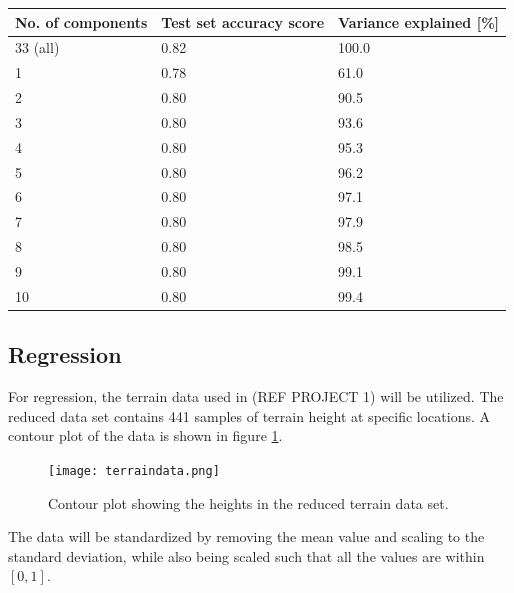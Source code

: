 \documentclass[a4paper,10pt,english]{article}
\begin{document}
\begin{table}[]
\begin{tabular}{|l|l|l|}
\hline
No. of components & Test set accuracy score & Variance explained {[}\%{]} \\ \hline
33 (all)          & 0.82                    & 100.0                       \\ \hline
1                 & 0.78                    & 61.0                        \\ \hline
2                 & 0.80                    & 90.5                        \\ \hline
3                 & 0.80                    & 93.6                        \\ \hline
4                 & 0.80                    & 95.3                        \\ \hline
5                 & 0.80                    & 96.2                        \\ \hline
6                 & 0.80                    & 97.1                        \\ \hline
7                 & 0.80                    & 97.9                        \\ \hline
8                 & 0.80                    & 98.5                        \\ \hline
9                 & 0.80                    & 99.1                        \\ \hline
10                & 0.80                    & 99.4                        \\ \hline
\end{tabular}
\label{tab:pca}
\end{table}

\subsection{Regression}

For regression, the terrain data used in (REF PROJECT 1) will be utilized. The reduced data set contains 441 samples of terrain height at specific locations. A contour plot of the data is shown in figure \ref{fig:terraindata}.

\begin{figure}
    \centering
    \texttt{[image: terraindata.png]}
    \caption{Contour plot showing the heights in the reduced terrain data set.}
    \label{fig:terraindata}
\end{figure}

The data will be standardized by removing the mean value and scaling to the standard deviation, while also being scaled such that all the values are within $[0, 1]$. 
\end{document}
